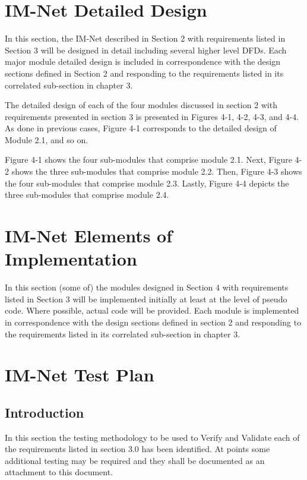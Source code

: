 \documentclass[letterpaper]{article}
\begin{document}
\eject

\section{IM-Net Detailed Design}

In this section, the IM-Net described in Section 2 with requirements listed in Section 3 will be designed in detail including several higher level DFDs. Each major module detailed design is included in correspondence with the design sections defined in Section 2 and responding to the requirements listed in its correlated sub-section in chapter 3.

The detailed design of each of the four modules discussed in section 2 with requirements presented in section 3 is presented in Figures 4-1, 4-2, 4-3, and 4-4. As done in previous cases, Figure 4-1 corresponds to the detailed design of Module 2.1, and so on.

Figure 4-1 shows the four sub-modules that comprise module 2.1. Next, Figure 4-2 shows the three sub-modules that comprise module 2.2. Then, Figure 4-3 shows the four sub-modules that comprise module 2.3. Lastly, Figure 4-4 depicts the three sub-modules that comprise module 2.4.

\eject 

 
\section{IM-Net Elements of Implementation}

In this section (some of) the modules designed in Section 4 with requirements listed in Section 3 will be implemented initially at least at the level of pseudo code. Where possible, actual code will be provided. Each module is implemented in correspondence with the design sections defined in section 2 and responding to the requirements listed in its correlated sub-section in chapter 3.

\eject 

\section{IM-Net Test Plan}

\subsection{Introduction}

In this section the testing methodology to be used to Verify and Validate each of the requirements listed in section 3.0 has been identified. At points some additional testing may be required and they shall be documented as an attachment to this document. 
\end{document}
